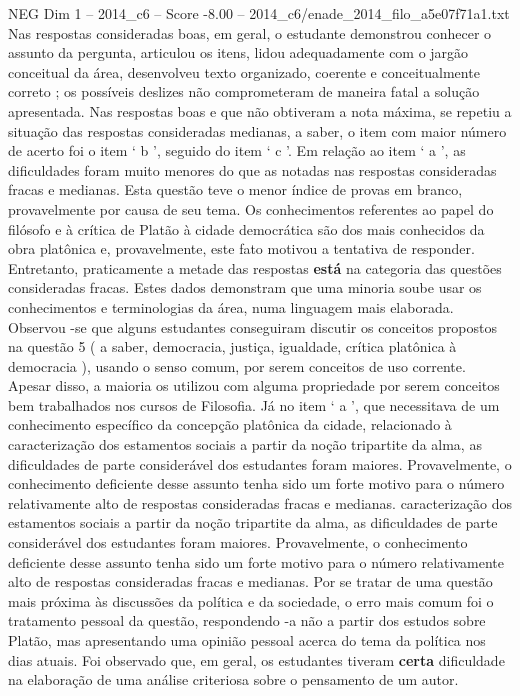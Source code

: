 \begin{textsample}{NEG Dim 1 – 2014\_c6 – Score -8.00 – 2014\_c6/enade\_2014\_filo\_a5e07f71a1.txt}
Nas respostas consideradas boas, em geral, o estudante demonstrou conhecer o assunto da pergunta, articulou os itens, lidou adequadamente com o jargão conceitual da área, desenvolveu texto organizado, coerente e conceitualmente correto ; os possíveis deslizes não comprometeram de maneira fatal a solução apresentada.
Nas respostas boas e que não obtiveram a nota máxima, se repetiu a situação das respostas consideradas medianas, a saber, o item com maior número de acerto foi o item ‘ b ’, seguido do item ‘ c ’.
Em relação ao item ‘ a ’, as dificuldades foram muito menores do que as notadas nas respostas consideradas fracas e medianas.
Esta questão teve o menor índice de provas em branco, provavelmente por causa de seu tema.
Os conhecimentos referentes ao papel do filósofo e à crítica de Platão à cidade democrática são dos mais conhecidos da obra platônica e, provavelmente, este fato motivou a tentativa de responder.
Entretanto, praticamente a metade das respostas \textbf{está} na categoria das questões consideradas fracas.
Estes dados demonstram que uma minoria soube usar os conhecimentos e terminologias da área, numa linguagem mais elaborada.
Observou -se que alguns estudantes conseguiram discutir os conceitos propostos na questão 5 ( a saber, democracia, justiça, igualdade, crítica platônica à democracia ), usando o senso comum, por serem conceitos de uso corrente.
Apesar disso, a maioria os utilizou com alguma propriedade por serem conceitos bem trabalhados nos cursos de Filosofia.
Já no item ‘ a ’, que necessitava de um conhecimento específico da concepção platônica da cidade, relacionado à caracterização dos estamentos sociais a partir da noção tripartite da alma, as dificuldades de parte considerável dos estudantes foram maiores.
Provavelmente, o conhecimento deficiente desse assunto tenha sido um forte motivo para o número relativamente alto de respostas consideradas fracas e medianas. caracterização dos estamentos sociais a partir da noção tripartite da alma, as dificuldades de parte considerável dos estudantes foram maiores.
Provavelmente, o conhecimento deficiente desse assunto tenha sido um forte motivo para o número relativamente alto de respostas consideradas fracas e medianas.
Por se tratar de uma questão mais próxima às discussões da política e da sociedade, o erro mais comum foi o tratamento pessoal da questão, respondendo -a não a partir dos estudos sobre Platão, mas apresentando uma opinião pessoal acerca do tema da política nos dias atuais.
Foi observado que, em geral, os estudantes tiveram \textbf{certa} dificuldade na elaboração de uma análise criteriosa sobre o pensamento de um autor.

\end{textsample}
